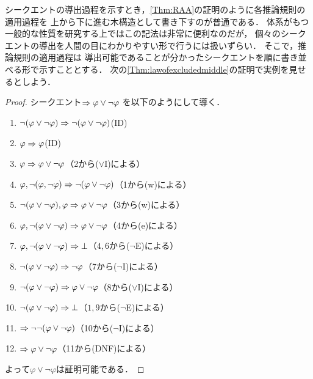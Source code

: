 シークエントの導出過程を示すとき，\cref{Thm:RAA}の証明のように各推論規則の適用過程を
上から下に進む木構造として書き下すのが普通である．
体系がもつ一般的な性質を研究する上ではこの記法は非常に便利なのだが，
個々のシークエントの導出を人間の目にわかりやすい形で行うには扱いずらい．
そこで，推論規則の適用過程は
導出可能であることが分かったシークエントを順に書き並べる形で示すこととする．
次の\cref{Thm:lawofexcludedmiddle}の証明で実例を見せるとしよう．


\begin{proof}
	シークエント\(\Rightarrow \varphi \lor \lnot \varphi\)
	を以下のようにして導く．
	\begin{enumerate}
		\item \(\lnot \paren{\varphi \lor \lnot \varphi} \sequent \lnot \paren{\varphi \lor \lnot \varphi}\)\quad (ID)
		\item \(\varphi \Rightarrow \varphi\)\quad (ID)
		\item \(\varphi \Rightarrow \varphi \lor \lnot \varphi\)\quad （2から(\(\lor\)I)による）
		\item \(\varphi, \lnot \paren{\varphi, \lnot \varphi} \sequent \lnot \paren{\varphi \lor \lnot \varphi}\)\quad （1から(w)による）
		\item \(\lnot \paren{\varphi \lor \lnot \varphi}, \varphi \sequent \varphi \lor \lnot \varphi\)\quad （3から(w)による）
		\item \(\varphi,\lnot \paren{\varphi \lor \lnot \varphi} \sequent \varphi \lor \lnot \varphi\)\quad （4から(e)による）
		\item \(\varphi, \lnot \paren{\varphi \lor \lnot \varphi} \sequent \bot\)\quad （\(4,6\)から(\(\lnot\)E)による）
		\item \(\lnot \paren{\varphi \lor \lnot \varphi} \sequent \lnot \varphi\)\quad （7から(\(\lnot\)I)による）
		\item \(\lnot \paren{\varphi \lor \lnot \varphi} \sequent \varphi \lor \lnot \varphi\)\quad （8から(\(\lor\)I)による）
		\item \(\lnot \paren{\varphi \lor \lnot \varphi} \sequent \bot\)\quad （\(1,9\)から(\(\lnot\)E)による）
		\item \(\sequent \lnot \lnot \paren{\varphi \lor \lnot \varphi}\)\quad （10から(\(\lnot\)I)による）
		\item \(\Rightarrow \varphi \lor \lnot \varphi\)\quad （11から(DNF)による）
	\end{enumerate}
	よって\(\varphi \lor \lnot \varphi\)は証明可能である．
\end{proof}

